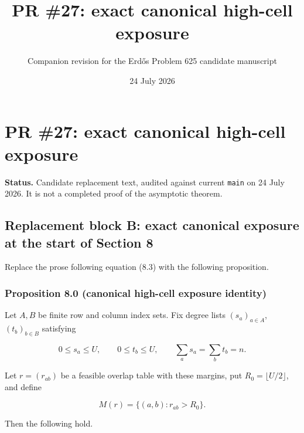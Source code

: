 \documentclass[11pt]{article}
\title{PR \#27: exact canonical high-cell exposure}
\author{Companion revision for the Erd\H{o}s Problem 625 candidate manuscript}
\date{24 July 2026}
\begin{document}
\maketitle
\section{PR \#27: exact canonical high-cell exposure}\label{pr-27-exact-canonical-high-cell-exposure}

\textbf{Status.} Candidate replacement text, audited against current \texttt{main} on 24 July 2026. It is not a completed proof of the asymptotic theorem.

\subsection{Replacement block B: exact canonical exposure at the start of Section 8}\label{replacement-block-b-exact-canonical-exposure-at-the-start-of-section-8}

Replace the prose following equation (8.3) with the following proposition.

\subsubsection{Proposition 8.0 (canonical high-cell exposure identity)}\label{proposition-8.0-canonical-high-cell-exposure-identity}

Let \(A,B\) be finite row and column index sets. Fix degree lists \((s_a)_{a\in A}\), \((t_b)_{b\in B}\) satisfying

\[
 0\le s_a\le U,\qquad 0\le t_b\le U,
 \qquad
 \sum_a s_a=\sum_b t_b=n.
 \tag{8.3a}
\]

Let \(r=(r_{ab})\) be a feasible overlap table with these margins, put \(R_0=\lfloor U/2\rfloor\), and define

\[
 M(r)=\{(a,b):r_{ab}>R_0\}.
\]

Then the following hold.
\end{document}
